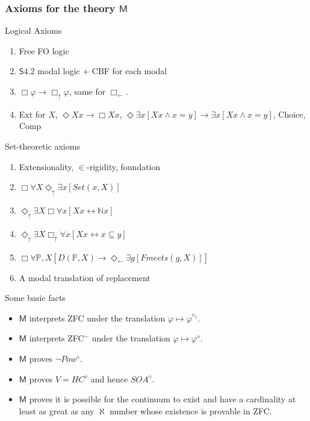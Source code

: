 \documentclass{beamer}
\newcommand{\du}{\Diamond_\uparrow}
\newcommand{\dl}{\Diamond_\leftarrow}
\newcommand{\bu}{\Box_\uparrow}
\newcommand{\bl}{\Box_\leftarrow}
\begin{document}
\begin{frame}
    \frametitle{Axioms for the theory $\mathsf{M}$}
    \begin{block}{Logical Axioms}
    \begin{enumerate}
        \item<2-> Free FO logic
        \item<3-> $\mathsf{S4.2}$ modal logic + CBF for each modal
        \item<4-> $\Box \varphi \rightarrow \bu \varphi$, same for $\bl$.
        \item<5-> Ext for $X$, $\Diamond Xx \rightarrow \Box Xx$, 
        $\Diamond \exists x[Xx \wedge x = y] \rightarrow \exists x[Xx \wedge x = y]$,
        Choice, Comp
    \end{enumerate}
    \end{block}
    \begin{block}{Set-theoretic axioms}
        \begin{enumerate}
        \item<7-> Extensionality, $\in$-rigidity, foundation
        \item<8-> $\Box \forall X \du \exists x [Set(x, X)]$
        \item<9-> $\du \exists X \Box \forall x[Xx \leftrightarrow \mathbb{N}x]$
        \item<10-> $\du \exists X \bu \forall x[Xx \leftrightarrow x \subseteq y]$
        \item<11-> $\Box \forall \mathbb{P}, X [D(\mathbb{P}, X)\rightarrow \dl \exists g[Fmeets(g, X)]]$
        \item<12-> A modal translation of replacement
        \end{enumerate}
    \end{block}
\end{frame}
\begin{frame}{Some basic facts}
    \begin{itemize}
        \item<2-> $\mathsf{M}$ interprets ZFC under the translation 
                    $\varphi \mapsto \varphi^{\diamond_\uparrow}$. 
        \item<3-> $\mathsf{M}$ interprets ZFC$^-$ under the translation 
                    $\varphi \mapsto \varphi^\diamond$.
        \item<4-> $\mathsf{M}$ proves $\neg Pow^\diamond$.
        \item<5-> $\mathsf{M}$ proves $V = HC^\diamond$ and hence $SOA^\diamond$.
        \item<6-> $\mathsf{M}$ proves it is possible for the continuum 
                    to exist and have a cardinality at least as great as 
                    any $\aleph$ number whose existence is provable 
                    in ZFC.
    \end{itemize}
\end{frame}
\end{document}
